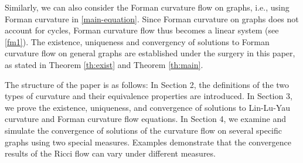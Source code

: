 \documentclass{article}
\newtheorem{corollary}{Corollary}[section]
\begin{document}
Similarly, we can also consider the Forman curvature flow on graphs, i.e., using Forman curvature in \eqref{main-equation}. Since Forman curvature on graphs does not account for cycles, Forman curvature flow thus becomes a linear system (see \eqref{fm1}). The existence, uniqueness and convergency of solutions to Forman curvature flow on general graphs are established under the surgery in this paper, as stated in Theorem \ref{th:exist} and Theorem \ref{th:main}.


The structure of the paper is as follows: In Section 2,  the definitions of the two types of curvature and their equivalence properties are introduced. In Section 3, we prove the existence, uniqueness, and convergence of solutions to Lin-Lu-Yau curvature and Forman curvature flow equations. In Section 4, we examine and simulate the convergence of solutions of the curvature flow on several specific graphs using two special  measures. Examples demonstrate that the convergence results of the Ricci flow can vary under different measures.








\end{document}
